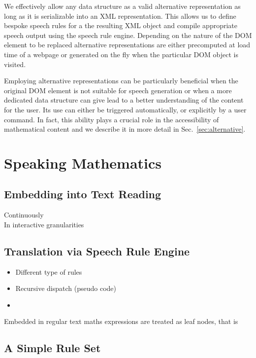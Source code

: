 \documentclass{acm_proc_article-sp}
\begin{document}
We effectively allow any data structure as a valid alternative representation as
long as it is serializable into an XML representation. This allows us to define
bespoke speech rules for a the resulting XML object and compile appropriate
speech output using the speech rule engine. Depending on the nature of the DOM
element to be replaced alternative representations are either precomputed at
load time of a webpage or generated on the fly when the particular DOM object is
visited.

Employing alternative representations can be particularly beneficial when the
original DOM element is not suitable for speech generation or when a more
dedicated data structure can give lead to a better understanding of the content
for the user. Its use can either be triggered automatically, or explicitly by a
user command. In fact, this ability plays a crucial role in the accessibility of
mathematical content and we describe it in more detail in
Sec.~\ref{sec:alternative}.


\section{Speaking Mathematics}
\label{sec:translate}

\subsection{Embedding into Text Reading}
\begin{description}
\item[Continuously] 
\item[In interactive granularities] 
\end{description}

\subsection{Translation via Speech Rule Engine}

\begin{itemize}
\item Different type of rules
\item Recursive dispatch (pseudo code)
\item 
\end{itemize}
Embedded in regular text maths expressions are treated as leaf nodes, that is


\subsection{A Simple Rule Set}
\end{document}
